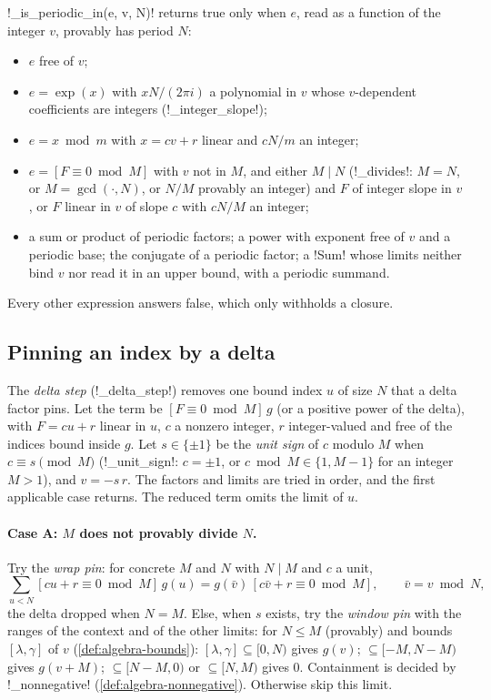 \begin{definition}\label{def:algebra-periodic}
\py!_is_periodic_in(e, v, N)! returns true only when $e$, read as a function of the integer $v$, provably has period $N$:
\begin{itemize}
\item $e$ free of $v$;
\item $e=\exp(x)$ with $xN/(2\pi i)$ a polynomial in $v$ whose $v$-dependent coefficients are integers (\py!_integer_slope!);
\item $e=x\bmod m$ with $x=cv+r$ linear and $cN/m$ an integer;
\item $e=[F\equiv 0\bmod M]$ with $v$ not in $M$, and either $M\mid N$ (\py!_divides!: $M=N$, or $M=\gcd(\cdot,N)$, or $N/M$ provably an integer) and $F$ of integer slope in $v$, or $F$ linear in $v$ of slope $c$ with $cN/M$ an integer;
\item a sum or product of periodic factors; a power with exponent free of $v$ and a periodic base; the conjugate of a periodic factor; a \py!Sum! whose limits neither bind $v$ nor read it in an upper bound, with a periodic summand.
\end{itemize}
Every other expression answers false, which only withholds a closure.
\end{definition}

\subsection{Pinning an index by a delta}\label{sec:algebra-simplify-delta}

The \emph{delta step} (\py!_delta_step!) removes one bound index $u$ of size $N$ that a delta factor pins. Let the term be $[F\equiv 0\bmod M]\,g$ (or a positive power of the delta), with $F=cu+r$ linear in $u$, $c$ a nonzero integer, $r$ integer-valued and free of the indices bound inside $g$. Let $s\in\{\pm1\}$ be the \emph{unit sign} of $c$ modulo $M$ when $c\equiv s \pmod M$ (\py!_unit_sign!: $c=\pm1$, or $c\bmod M\in\{1,M-1\}$ for an integer $M>1$), and $v=-s\,r$. The factors and limits are tried in order, and the first applicable case returns. The reduced term omits the limit of $u$.

\paragraph{Case A: $M$ does not provably divide $N$.} Try the \emph{wrap pin}: for concrete $M$ and $N$ with $N\mid M$ and $c$ a unit,
\begin{equation}
\sum_{u<N}[cu+r\equiv 0\bmod M]\,g(u)=g(\bar v)\,[c\bar v+r\equiv 0\bmod M],\qquad \bar v=v\bmod N,
\end{equation}
the delta dropped when $N=M$. Else, when $s$ exists, try the \emph{window pin} with the ranges of the context and of the other limits: for $N\le M$ (provably) and bounds $[\lambda,\gamma]$ of $v$ (\cref{def:algebra-bounds}): $[\lambda,\gamma]\subseteq[0,N)$ gives $g(v)$; $\subseteq[-M,N-M)$ gives $g(v+M)$; $\subseteq[N-M,0)$ or $\subseteq[N,M)$ gives $0$. Containment is decided by \py!_nonnegative! (\cref{def:algebra-nonnegative}). Otherwise skip this limit.

